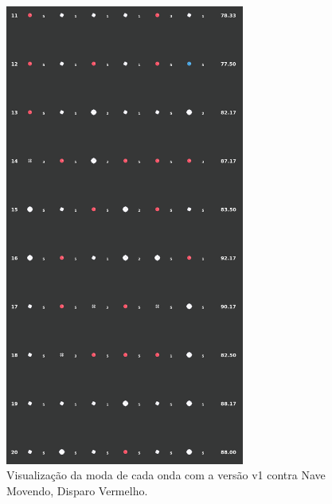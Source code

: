\begin{figure}[H]
  \centering
  \includegraphics[width=0.7\textwidth]{figuras/ss/ss_redmove_ai_mode_1_2.png}
  \caption{Visualização da moda de cada onda com a versão v1 contra Nave Movendo, Disparo Vermelho.}
  \label{fig:ss-moda-rm-1-2}
\end{figure}


